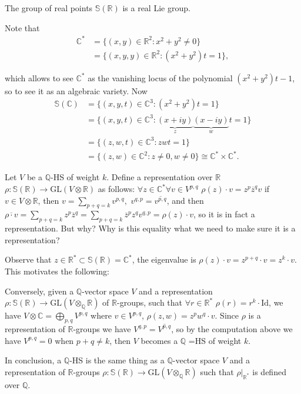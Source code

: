 \noindent
The group of real points
$\mathbb{S}(\mathbb{R})$ is a real Lie group.

Note that
$$
\begin{aligned}
\mathbb{C}^*&=
\{(x,y) \in \mathbb{R}^2:x^2+y^2\neq 0\}\\
&=\{(x,y,y)\in \mathbb{R}^2:(x^2+y^2)t=1\},
\end{aligned}
$$

\noindent
which allows to see $\mathbb{C}^\ast$
as the vanishing locus of the polynomial
$(x^2+y^2)t-1$, so to see it as an algebraic
variety.
Now
$$
\begin{aligned}
\mathbb{S}(\mathbb{C})&=
\{(x,y,t)\in \mathbb{C}^3:(x^2+y^2)t=1\}\\
&=\{(x,y,t)\in
\mathbb{C}^3:\underbrace{(x+iy)}_{z}
\underbrace{(x-iy)}_{w}t=1\}\\
&=\{(z,w,t)\in\mathbb{C}^3:zwt=1\}\\
&=
\{(z,w)\in\mathbb{C}^2:z\neq 0, w\neq 0\}
\cong \mathbb{C}^*\times\mathbb{C}^*.
\end{aligned}
$$

\medskip\noindent
Let $V$ be a $\mathbb{Q}$-HS of weight $k$.
Define a representation over $\mathbb{R}$
$\rho:\mathbb{S}(\mathbb{R}) \to
\text{GL}(V\otimes\mathbb{R})$
as follows:
$\forall z \in \mathbb{C}^*\forall v \in
V^{p,q}$
$\rho(z)\cdot v=z^p \overline{z}^qv$
if $v \in V \otimes \mathbb{R}$,
then $v = \sum_{ p+q=k}v^{p,q},$
$v^{q,p}=\overline{v^{p,q}}$,
and then
$\overline{\rho\cdot v}
=\sum_{p+q=k}z^p \overline{z}^q
=\sum_{p+q=k}\overline{z}^pz^qv^{q,p}
=\rho(z)\cdot v$,
so it is in fact a representation.
But why? Why is this equality what we need
to make sure it is a representation?

Observe that $z \in
\mathbb{R}^*\subset\mathbb{S}(\mathbb{R})=
\mathbb{C}^*$,
the eigenvalue is
$\rho(z)\cdot v= z^{p+q}\cdot v=z^k\cdot v$.
This motivates the following:

Conversely,
given a $\mathbb{Q}$-vector space $V$
and a representation
$\rho:\mathbb{S}(\mathbb{R}) \to
\text{GL}(V\otimes_{\mathbb{Q}}\mathbb{R})$
of $\mathbb{R}$-groups, such that
$\forall r \in \mathbb{R}^*$
$\rho (r)=r^k\cdot \text{Id}$,
we have
$V \otimes \mathbb{C}=\bigoplus_{p,q}V^{p,q}$
where $v \in V^{p,q}$,
$\rho(z,w)=z^pw^q\cdot v$.
Since $\rho$ is a representation of
$\mathbb{R}$-groups
we have $V^{q,p}=\overline{V^{p,q}}$,
so by the computation above we have
$V^{p,q}=0$ when $p+q \neq k$,
then $V$ becomes a $\mathbb{Q}$ =HS
of weight $k$.

In conclusion, a $\mathbb{Q}$-HS is the same
thing as a
$\mathbb{Q}$-vector space $V$ and a
representation
of $\mathbb{R}$-groups
$\rho:\mathbb{S}(\mathbb{R}) \to
\text{GL}(V\otimes_{\mathbb{Q}}\mathbb{R})$
such that $\rho |_{\mathbb{R}^*}$
is defined over $\mathbb{Q}$.

